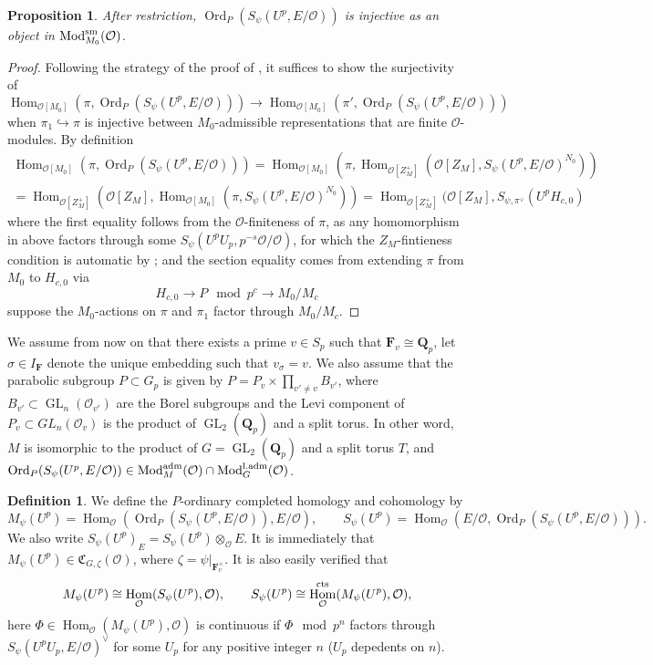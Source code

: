 \documentclass[leqno]{amsart}
\newcommand{\aMod}{\textnormal{Mod}^{\textnormal{adm}}}
\newcommand{\laMod}{\textnormal{Mod}^{\textnormal{l.adm}}}
\DeclareMathOperator{\Mod}{\textnormal{Mod}}
\DeclareMathOperator{\Ord}{Ord}
\newcommand{\cts}{\textnormal{cts}}
\newcommand{\sm}{\textnormal{sm}}
\DeclareMathOperator{\GL}{GL}
\newcommand{\Q}{{\mathbf{Q}}}
\newcommand{\Qp}{\mathbf{Q}_p}
\newcommand{\F}{{\mathbf{F}}} %
\newcommand{\oo}{\mathcal O}
\newcommand{\1}{\mathbf{1}}
\newcommand{\fC}{\mathfrak C}
\DeclareMathOperator{\Hom}{Hom}
\newtheorem{prop}[thm]{Proposition}
\theoremstyle{definition}
\newtheorem{defn}[thm]{Definition}
\theoremstyle{remark}
\begin{document}
\begin{prop}
	After restriction, 
	$\Ord_P(S_\psi(U^p,E/\oo))$ is injective
	as an object in $\Mod^{\sm}_{M_0}(\oo)$.
\end{prop}
\begin{proof}
	Following the strategy of the proof of 
	\cite[Prop 3.2.4]{pan}, it suffices to show the surjectivity of
	\[
		\Hom_{\oo[M_0]}(\pi,\Ord_P(S_\psi(U^p,E/\oo)))\to 
		\Hom_{\oo[M_0]}(\pi',\Ord_P(S_\psi(U^p,E/\oo)))
	\]
	when $\pi_{1}\hookrightarrow \pi$ 
	is injective between $M_0$-admissible
	representations that are finite $\oo$-modules.
	By definition
	\begin{multline*}
		\Hom_{\oo[M_0]}(\pi,\Ord_P(S_\psi(U^p,E/\oo)))=
		\Hom_{\oo[M_0]}(\pi,
		\Hom_{\oo[Z_M^+]}
		(\oo[Z_M], S_\psi(U^p,E/\oo)^{N_0}))\\=
		\Hom_{\oo[Z_M^+]}(\oo[Z_M],
		\Hom_{\oo[M_0]}(\pi, S_\psi(U^p,E/\oo)^{N_0}))=
		\Hom_{\oo[Z_M^+]}(\oo[Z_M],
		S_{\psi,\pi^\vee}(U^pH_{c,0})
	\end{multline*}
	where the first equality follows from the $\oo$-finiteness of $\pi$,
	as any homomorphism in above factors through some 
	$S_\psi(U^pU_p,p^{-s}\oo/\oo)$,
	for which
	the $Z_M$-fintieness condition is automatic
	by \cite[Lem 3.1.5]{emeI};
	and the section equality comes from 
	extending $\pi$ from  $M_0$ to  $H_{c,0}$ via
	\[
		H_{c,0}\to P \mod p^c\to M_0/M_c
	\]
	suppose the $M_0$-actions on  $\pi$ and  $\pi_1$
	factor through  $M_0/M_c$.
\end{proof}




We assume from now on that 
there exists a prime $v\in S_p$
such that  $\F_v\cong \Qp$,
let  $\sigma\in I_\F$
denote the unique embedding such that  $v_\sigma=v$.
We also assume that 
the parabolic subgroup $P\subset G_p$ is given by 
$P=P_v\times\prod_{v'\neq v}B_{v'}$,
where $B_{v'}\subset \GL_n(\oo_{v'})$
are the Borel subgroups
and the Levi component of $P_v\subset GL_n(\oo_v)$
is the product of $\GL_2(\Q_p)$ and a split torus.
In other word, $M$ is isomorphic to the product  
of  $G=\GL_2(\Qp)$ and a split torus  $T$,
and  $\Ord_P(S_\psi(U^p,E/\oo))\in \aMod_M(\oo)\cap \laMod_{G}(\oo)$.
\begin{defn}
	We define the $P$-ordinary completed homology and cohomology by
	\begin{equation*}
		M_\psi(U^p)=\Hom_\oo(\Ord_P(S_\psi(U^p,E/\oo)),E/\oo),\qquad
		S_\psi(U^p)=\Hom_\oo(E/\oo, \Ord_P(S_\psi(U^p,E/\oo))).
	\end{equation*}
	We also write $S_{\psi}(U^p)_E=S_\psi(U^p)\otimes_\oo E$.
	It is immediately that 
	$M_\psi(U^p)\in \fC_{G,\zeta}(\oo)$,
	where $\zeta=\psi\vert_{\F_v^\times}$.
	It is also easily verified that 
	\[
		M_\psi(U^p)\cong \Hom_\oo(S_\psi(U^p),\oo),\qquad
		S_\psi(U^p)\cong \Hom_\oo^{\cts}(M_\psi(U^p),\oo),
	\]
	here $\Phi\in \Hom_\oo(M_\psi(U^p),\oo)$ 
	is continuous if 
	$\Phi \mod p^n$ factors through
	$S_{\psi}(U^pU_p,E/\oo)^\vee$ for some $U_p$
	for any positive integer $n$
	($U_p$ depedents on  $n$).
\end{defn}
\end{document}
